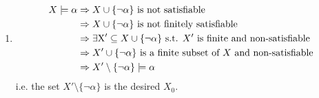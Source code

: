 \documentclass[12pt,a4paper]{report}
\theoremstyle{definition}
\theoremstyle{definition}
\begin{document}
\begin{enumerate}[label=(\arabic*)]
\item
    \begin{align*}
        X\models\alpha&\Rightarrow X\cup \{\neg\alpha\}\text{ is not satisfiable}\\
                      &\Rightarrow X\cup \{\neg\alpha\}\text{ is not finitely satisfiable}\\
                      &\Rightarrow \exists\text X'\subseteq X\cup\{\neg\alpha\}\text{ s.t. }X'\text{ is finite and non-satisfiable}\\
                      &\Rightarrow X'\cup\{\neg\alpha\}\text{ is a finite subset of $X$ and non-satisfiable}\\
                      &\Rightarrow X'\setminus\{\neg\alpha\}\models\alpha
    \end{align*}
    i.e. the set $X'\setminus\{\neg\alpha\}$ is the desired $X_0$.

\end{enumerate}
\end{document}
